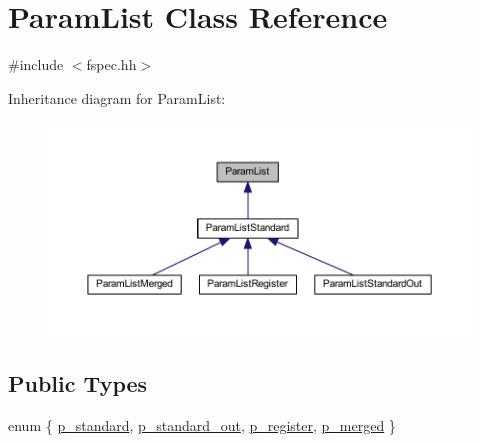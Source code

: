 \hypertarget{class_param_list}{}\section{Param\+List Class Reference}
\label{class_param_list}


{\ttfamily \#include $<$fspec.\+hh$>$}



Inheritance diagram for Param\+List\+:
\nopagebreak
\begin{figure}[H]
\begin{center}
\leavevmode
\includegraphics[width=350pt]{class_param_list__inherit__graph}
\end{center}
\end{figure}
\subsection*{Public Types}
\begin{DoxyCompactItemize}
\item 
enum \{ \mbox{\hyperlink{class_param_list_a2aa16823d6e3b1c3c709e5540a8dcc3aab453d87526025f49089a32288f6348df}{p\+\_\+standard}}, 
\mbox{\hyperlink{class_param_list_a2aa16823d6e3b1c3c709e5540a8dcc3aa7fb6a81d3016db3c978ba684a8b6d84d}{p\+\_\+standard\+\_\+out}}, 
\mbox{\hyperlink{class_param_list_a2aa16823d6e3b1c3c709e5540a8dcc3aae70ffa842058a730402c0c51be6093a7}{p\+\_\+register}}, 
\mbox{\hyperlink{class_param_list_a2aa16823d6e3b1c3c709e5540a8dcc3aa563fe0da99c126228910fbcd01a2bbf0}{p\+\_\+merged}}
 \}
\end{DoxyCompactItemize}
